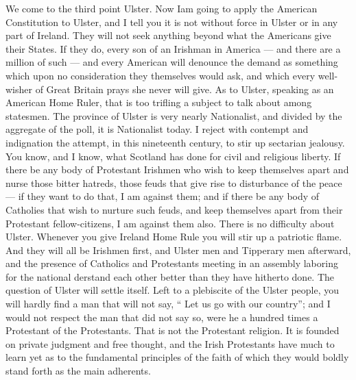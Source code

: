 \documentclass[11pt,openany]{book}
\begin{document}
We come to the third point Ulster. Now Iam going to apply the American Constitution to Ulster, and I tell you it is not without force in Ulster or in any part of Ireland. They will not seek anything beyond what the Americans give their States. If they do, every son of an Irishman in America --- and there are a million of such --- and every American will denounce the demand as something which upon no consideration they themselves would ask, and which every well-wisher of Great Britain prays she never will give. As to Ulster, speaking as an American Home Ruler, that is too trifling a subject to talk about among statesmen. The province of Ulster is very nearly Nationalist, and divided by the aggregate of the poll, it is Nationalist today. I reject with contempt and indignation the attempt, in this nineteenth century, to stir up sectarian jealousy. You know, and I know, what Scotland has done for civil and religious liberty. If there be any body of Protestant Irishmen who wish to keep themselves apart and nurse those bitter hatreds, those feuds that give rise to disturbance of the peace --- if they want to do that, I am against them; and if there be any body of Catholies that wish to nurture such feuds, and keep themselves apart from their Protestant fellow-citizens, I am against them also. There is no difficulty about Ulster. Whenever you give Ireland Home Rule you will stir up a patriotic flame. And they will all be Irishmen first, and Ulster men and Tipperary men afterward, and the presence of Catholics and Protestants meeting in an assembly laboring for the national derstand each other better than they have hitherto done. The question of Ulster will settle itself. Left to a plebiscite of the Ulster people, you will hardly find a man that will not say, `` Let us go with our country''; and I would not respect the man that did not say so, were he a hundred times a Protestant of the Protestants. That is not the Protestant religion. It is founded on private judgment and free thought, and the Irish Protestants have much to learn yet as to the fundamental principles of the faith of which they would boldly stand forth as the main adherents.
\end{document}
